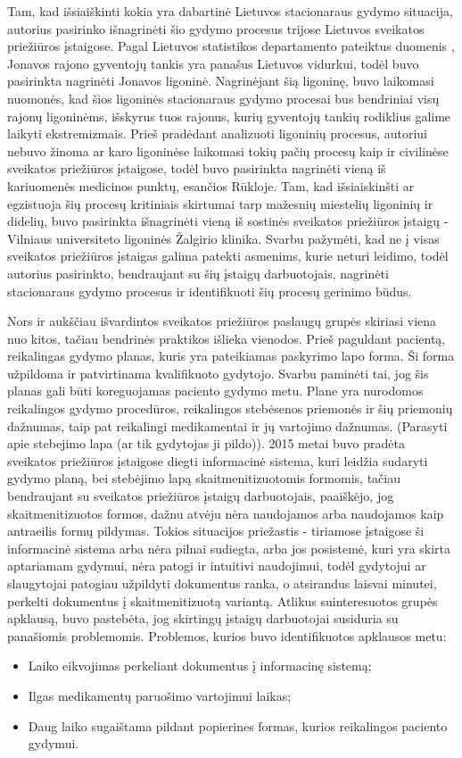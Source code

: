 Tam, kad išsiaiškinti kokia yra dabartinė Lietuvos stacionaraus gydymo situacija, autorius pasirinko išnagrinėti šio gydymo procesus trijose Lietuvos sveikatos priežiūros įstaigose. Pagal Lietuvos statistikos departamento pateiktus duomenis \cite{Gyvento2017}, Jonavos rajono gyventojų tankis yra panašus Lietuvos vidurkui, todėl buvo pasirinkta nagrinėti Jonavos ligoninė. Nagrinėjant šią ligoninę, buvo laikomasi nuomonės, kad šios ligoninės stacionaraus gydymo procesai bus bendriniai visų rajonų ligoninėms, išskyrus tuos rajonus, kurių gyventojų tankių rodiklius galime laikyti ekstremizmais. Prieš pradėdant analizuoti ligoninių procesus, autoriui nebuvo žinoma ar karo ligoninėse laikomasi tokių pačių procesų kaip ir civilinėse sveikatos priežiūros įstaigose, todėl buvo pasirinkta nagrinėti vieną iš kariuomenės medicinos punktų, esančios Rūkloje. Tam, kad išsiaiskinšti ar egzistuoja šių procesų kritiniais skirtumai tarp mažesnių miestelių ligoninių ir didelių, buvo pasirinkta išnagrinėti vieną iš sostinės sveikatos priežiūros įstaigų - Vilniaus universiteto ligoninės Žalgirio klinika. Svarbu pažymėti, kad ne į visas sveikatos priežiūros įstaigas galima patekti asmenims, kurie neturi leidimo, todėl autorius pasirinkto, bendraujant su šių įstaigų darbuotojais, nagrinėti stacionaraus gydymo procesus ir identifikuoti šių procesų gerinimo būdus.

Nors ir aukščiau išvardintos sveikatos priežiūros paslaugų grupės skiriasi viena nuo kitos, tačiau bendrinės praktikos išlieka vienodos. Prieš paguldant pacientą, reikalingas gydymo planas, kuris yra pateikiamas paskyrimo lapo forma. Ši forma užpildoma ir patvirtinama kvalifikuoto gydytojo. Svarbu paminėti tai, jog šis planas gali būti koreguojamas paciento gydymo metu. Plane yra nurodomos reikalingos gydymo procedūros, reikalingos stebėsenos priemonės ir šių priemonių dažnumas, taip pat reikalingi medikamentai ir jų vartojimo dažnumas. (Parasyti apie stebejimo lapa (ar tik gydytojas ji pildo)). 2015 metai buvo pradėta sveikatos priežiūros įstaigose diegti informacinė sistema, kuri leidžia sudaryti gydymo planą, bei stebėjimo lapą skaitmenitizuotomis formomis, tačiau bendraujant su sveikatos priežiūros įstaigų darbuotojais, paaiškėjo, jog skaitmenitizuotos formos, dažnu atvėju nėra naudojamos arba naudojamos kaip antraeilis formų pildymas. Tokios situacijos priežastis - tiriamose įstaigose ši informacinė sistema arba nėra pilnai sudiegta, arba jos posistemė, kuri yra skirta aptariamam gydymui, nėra patogi ir intuitivi naudojimui, todėl gydytojui ar slaugytojai patogiau užpildyti dokumentus ranka, o atsirandus laisvai minutei, perkelti dokumentus į skaitmenitizuotą variantą. Atlikus suinteresuotos grupės apklausą, buvo pastebėta, jog skirtingų įstaigų darbuotojai susiduria su panašiomis problemomis. Problemos, kurios buvo identifikuotos apklausos metu: 
\begin{itemize}
    \item Laiko eikvojimas perkeliant dokumentus į informacinę sistemą;
    \item Ilgas medikamentų paruošimo vartojimui laikas;
    \item Daug laiko sugaištama pildant popierines formas, kurios reikalingos paciento gydymui.
\end{itemize}


